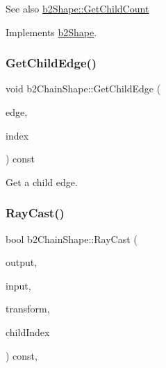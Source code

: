 \begin{DoxySeeAlso}{See also}
\mbox{\hyperlink{classb2_shape_a05a3c445017d96df9238ceefe6ce37ab}{b2\+Shape\+::\+Get\+Child\+Count}} 
\end{DoxySeeAlso}


Implements \mbox{\hyperlink{classb2_shape_a05a3c445017d96df9238ceefe6ce37ab}{b2\+Shape}}.

\mbox{\label{classb2_chain_shape_abfe7f836d3c32dc06b920df61a74f412}} 
\subsubsection{\texorpdfstring{GetChildEdge()}{GetChildEdge()}}
{\footnotesize\ttfamily void b2\+Chain\+Shape\+::\+Get\+Child\+Edge (\begin{DoxyParamCaption}\item[{\mbox{\hyperlink{classb2_edge_shape}{b2\+Edge\+Shape}} $\ast$}]{edge,  }\item[{\mbox{\hyperlink{b2_settings_8h_a43d43196463bde49cb067f5c20ab8481}{int32}}}]{index }\end{DoxyParamCaption}) const}



Get a child edge. 

\mbox{\label{classb2_chain_shape_add9e88f7f90b32ae75738cfb042ef532}} 
\subsubsection{\texorpdfstring{RayCast()}{RayCast()}}
{\footnotesize\ttfamily bool b2\+Chain\+Shape\+::\+Ray\+Cast (\begin{DoxyParamCaption}\item[{\mbox{\hyperlink{structb2_ray_cast_output}{b2\+Ray\+Cast\+Output}} $\ast$}]{output,  }\item[{const \mbox{\hyperlink{structb2_ray_cast_input}{b2\+Ray\+Cast\+Input}} \&}]{input,  }\item[{const \mbox{\hyperlink{structb2_transform}{b2\+Transform}} \&}]{transform,  }\item[{\mbox{\hyperlink{b2_settings_8h_a43d43196463bde49cb067f5c20ab8481}{int32}}}]{child\+Index }\end{DoxyParamCaption}) const\hspace{0.3cm}{\ttfamily [override]}, {\ttfamily [virtual]}}



